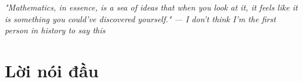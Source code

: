\documentclass{article}
\begin{document}
    

    \frontmatter

    \newpage

    \clearpage
    \begin{center}
        \thispagestyle{empty}
        \vspace*{\fill}
        \emph{"Mathematics, in essence, is a sea of ideas that when you look at it, it feels like it is something you could've discovered yourself."}
        \emph{--- I don't think I'm the first person in history to say this}
        \vspace*{\fill}
    \end{center}
    \clearpage

    \newpage
    
    \part*{Lời nói đầu}
    \newpage

    \tableofcontents
    \thispagestyle{empty}

    \newpage

    \mainmatter

    

    
\end{document}
